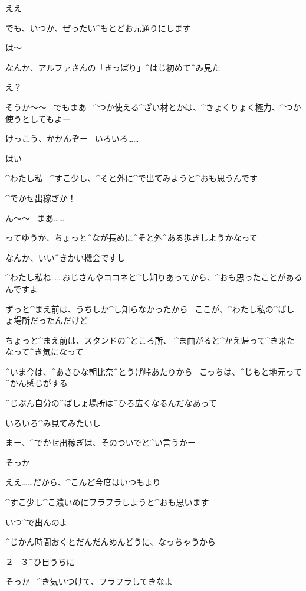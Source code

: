 \Alpha ええ

\Alpha でも、いつか、ぜったい^{もとどお}{元通}りにします

\page[123]
\Ojisan は〜

\Ojisan なんか、アルファさんの「きっぱり」^{はじ}{初}めて^{み}{見}た

\Alpha え？

\Ojisan そうか〜〜
\ でもまあ
\ ^{つか}{使}える^{ざい}{材}とかは、^{きょくりょく}{極力}、^{つか}{使}うとしてもよー

\Ojisan けっこう、かかんぞー
\ いろいろ……

\Alpha はい

\page[124]
\Alpha ^{わたし}{私}
\ ^{すこ}{少}し、^{そと}{外}に^{で}{出}てみようと^{おも}{思}うんです

\Ojisan ^{でかせ}{出稼}ぎか！

\Alpha ん〜〜
\ まあ……

\Alpha ってゆうか、ちょっと^{なが}{長}めに^{そと}{外}^{ある}{歩}きしようかなって

\page[125]
\Alpha なんか、いい^{きかい}{機会}ですし

\Alpha ^{わたし}{私}ね……おじさんやココネと^{し}{知}りあってから、^{おも}{思}ったことがあるんですよ

\Alpha ずっと^{まえ}{前}は、うちしか^{し}{知}らなかったから
\ ここが、^{わたし}{私}の^{ばしょ}{場所}だったんだけど

\Alpha ちょっと^{まえ}{前}は、スタンドの^{ところ}{所}、
^{ま}{曲}がると^{かえ}{帰}って^{き}{来}たなって^{き}{気}になって

\Alpha ^{いま}{今}は、^{あさひな}{朝比奈}^{とうげ}{峠}あたりから
\ こっちは、^{じもと}{地元}って^{かん}{感}じがする

\page[126]
\Alpha ^{じぶん}{自分}の^{ばしょ}{場所}は^{ひろ}{広}くなるんだなあって

\Alpha いろいろ^{み}{見}てみたいし

\Alpha まー、^{でかせ}{出稼}ぎは、そのついでと^{い}{言}うかー

\Ojisan そっか

\Alpha ええ……だから、^{こんど}{今度}はいつもより

\Alpha ^{すこ}{少}し^{こ}{濃}いめにフラフラしようと^{おも}{思}います

\page[127]
\Ojisan いつ^{で}{出}んのよ

\Alpha ^{じかん}{時間}おくとだんだんめんどうに、なっちゃうから

\Alpha ２
\ ３^{ひ}{日}うちに

\Ojisan そっか
\ ^{き}{気}いつけて、フラフラしてきなよ

